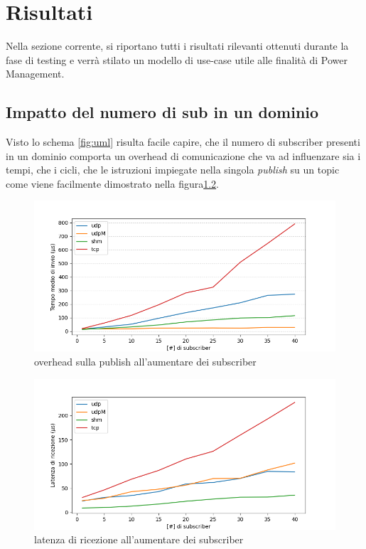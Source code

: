 \chapter{Risultati}%

Nella sezione corrente, si riportano tutti i risultati rilevanti ottenuti durante la fase di testing e verrà stilato un modello di use-case utile alle finalità di Power Management.

\section{Impatto del numero di sub in un dominio}
Visto lo schema \ref{fig:uml} risulta facile capire, che il numero di subscriber presenti in un dominio comporta un overhead di comunicazione che va ad influenzare sia i tempi, che i cicli, che le istruzioni impiegate nella singola \emph{publish} su un topic come viene facilmente dimostrato nella figura\ref{fig:test3_overhead}.
\begin{figure}[H]
    \centering
    \includegraphics[width=\textwidth]{./results/test3_sending_multiplesub.png} %
    \caption{overhead sulla publish all'aumentare dei subscriber}
    \label{fig:test3_overhead}
\end{figure}
\begin{figure}[H]
    \centering
    \includegraphics[width=\textwidth]{./results/test3_sendingreceiving_multiplesub.png} 
    \caption{latenza di ricezione all'aumentare dei subscriber}
    \label{fig:test3_overhead}
\end{figure}

